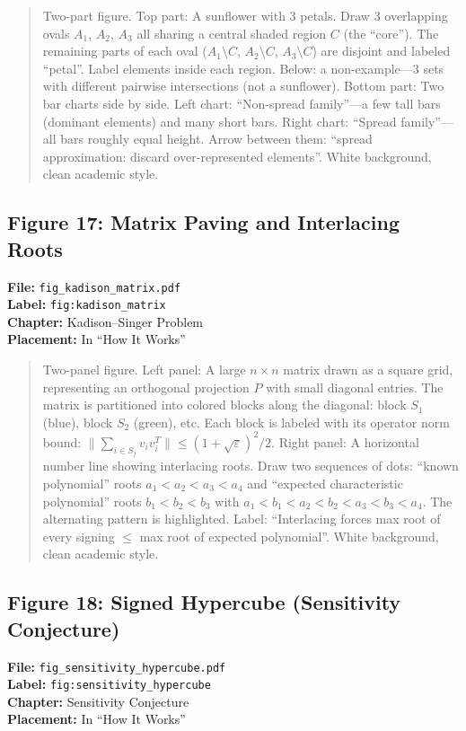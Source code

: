 \begin{quote}
Two-part figure. Top part: A sunflower with 3 petals. Draw 3 overlapping ovals $A_1$, $A_2$, $A_3$ all sharing a central shaded region $C$ (the ``core''). The remaining parts of each oval ($A_1 \setminus C$, $A_2 \setminus C$, $A_3 \setminus C$) are disjoint and labeled ``petal''. Label elements inside each region. Below: a non-example---3 sets with different pairwise intersections (not a sunflower). Bottom part: Two bar charts side by side. Left chart: ``Non-spread family''---a few tall bars (dominant elements) and many short bars. Right chart: ``Spread family''---all bars roughly equal height. Arrow between them: ``spread approximation: discard over-represented elements''. White background, clean academic style.
\end{quote}

\subsection*{Figure 17: Matrix Paving and Interlacing Roots}
\textbf{File:} \texttt{fig\_kadison\_matrix.pdf} \\
\textbf{Label:} \texttt{fig:kadison\_matrix} \\
\textbf{Chapter:} Kadison--Singer Problem \\
\textbf{Placement:} In ``How It Works''

\begin{quote}
Two-panel figure. Left panel: A large $n \times n$ matrix drawn as a square grid, representing an orthogonal projection $P$ with small diagonal entries. The matrix is partitioned into colored blocks along the diagonal: block $S_1$ (blue), block $S_2$ (green), etc. Each block is labeled with its operator norm bound: $\|\sum_{i \in S_j} v_i v_i^T\| \leq (1 + \sqrt{\varepsilon})^2 / 2$. Right panel: A horizontal number line showing interlacing roots. Draw two sequences of dots: ``known polynomial'' roots $a_1 < a_2 < a_3 < a_4$ and ``expected characteristic polynomial'' roots $b_1 < b_2 < b_3$ with $a_1 < b_1 < a_2 < b_2 < a_3 < b_3 < a_4$. The alternating pattern is highlighted. Label: ``Interlacing forces max root of every signing $\leq$ max root of expected polynomial''. White background, clean academic style.
\end{quote}

\subsection*{Figure 18: Signed Hypercube (Sensitivity Conjecture)}
\textbf{File:} \texttt{fig\_sensitivity\_hypercube.pdf} \\
\textbf{Label:} \texttt{fig:sensitivity\_hypercube} \\
\textbf{Chapter:} Sensitivity Conjecture \\
\textbf{Placement:} In ``How It Works''

